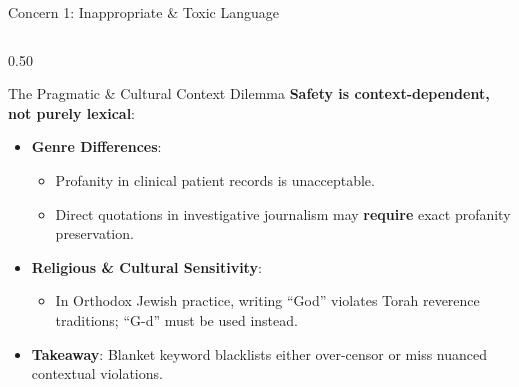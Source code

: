 \documentclass[aspectratio=169, 10pt]{beamer}
\begin{document}
\begin{frame}{Concern 1: Inappropriate \& Toxic Language}
\begin{columns}[T]
    \begin{column}{0.50\textwidth}
      \begin{exampleblock}{The Pragmatic \& Cultural Context Dilemma}
        \textbf{Safety is context-dependent, not purely lexical}:
        \begin{itemize}
          \item \textbf{Genre Differences}:
          \begin{itemize}
            \item Profanity in clinical patient records is \alert{unacceptable}.
            \item Direct quotations in investigative journalism may \textbf{require} exact profanity preservation.
          \end{itemize}
          \item \textbf{Religious \& Cultural Sensitivity}:
          \begin{itemize}
            \item In Orthodox Jewish practice, writing ``God'' violates Torah reverence traditions; ``G-d'' must be used instead.
          \end{itemize}
          \item \textbf{Takeaway}: Blanket keyword blacklists either over-censor or miss nuanced contextual violations.
        \end{itemize}
      \end{exampleblock}
    \end{column}
  \end{columns}
\end{frame}
\end{document}
